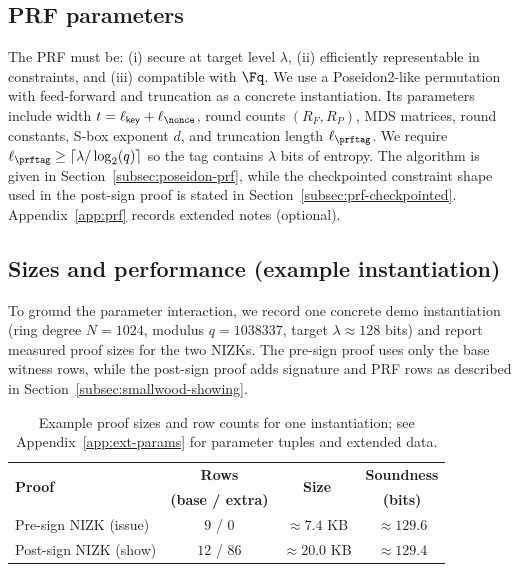 \subsection{PRF parameters}
The PRF must be:
(i) secure at target level \(\lambda\),
(ii) efficiently representable in constraints, and
(iii) compatible with \(\Fq\).
We use a Poseidon2-like permutation with feed-forward and truncation as a concrete instantiation. Its parameters
include width \(t=\ell_{\mathsf{key}}+\ell_{\nonce}\), round counts \((R_F,R_P)\), MDS matrices, round constants,
S-box exponent \(d\), and truncation length \(\ell_{\prftag}\). We require \(\ell_{\prftag}\ge
\lceil \lambda/\log_2(q)\rceil\) so the tag contains \(\lambda\) bits of entropy. The algorithm is given in
Section~\ref{subsec:poseidon-prf}, while the checkpointed constraint shape used in the post-sign proof is stated in
Section~\ref{subsec:prf-checkpointed}. Appendix~\ref{app:prf} records extended notes (optional).

\subsection{Sizes and performance (example instantiation)}
To ground the parameter interaction, we record one concrete demo instantiation (ring degree \(N=1024\), modulus
\(q=1038337\), target \(\lambda\approx 128\) bits) and report measured proof sizes for the two NIZKs. The pre-sign proof
uses only the base witness rows, while the post-sign proof adds signature and PRF rows as described in
Section~\ref{subsec:smallwood-showing}.

\begin{table}[H]
\centering
\renewcommand{\arraystretch}{1.1}
\begin{tabular}{@{}lccc@{}}
\toprule
\multirow{2}{*}{\textbf{Proof}} & \textbf{Rows} & \multirow{2}{*}{\textbf{Size}} & \textbf{Soundness} \\
 & \textbf{(base / extra)} &  & \textbf{(bits)} \\
\midrule
Pre-sign NIZK (issue) & \(9\) / \(0\) & \(\approx 7.4\) KB & \(\approx 129.6\) \\
Post-sign NIZK (show) & \(12\) / \(86\) & \(\approx 20.0\) KB & \(\approx 129.4\) \\
\bottomrule
\end{tabular}
\caption{Example proof sizes and row counts for one instantiation; see Appendix~\ref{app:ext-params} for parameter tuples
and extended data.}
\label{tab:proof-sizes}
\end{table}
